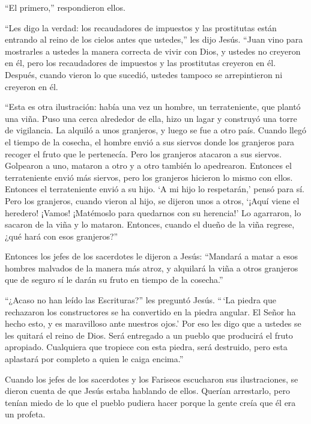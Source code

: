 ``El primero,'' respondieron ellos.

``Les digo la verdad: los recaudadores de impuestos y las prostitutas
están entrando al reino de los cielos antes que ustedes,'' les dijo
Jesús.  ``Juan vino para mostrarles a ustedes la manera
correcta de vivir con Dios, y ustedes no creyeron en él, pero los
recaudadores de impuestos y las prostitutas creyeron en él. Después,
cuando vieron lo que sucedió, ustedes tampoco se arrepintieron ni
creyeron en él.

 ``Esta es otra ilustración: había una vez un hombre, un
terrateniente, que plantó una viña. Puso una cerca alrededor de ella,
hizo un lagar y construyó una torre de vigilancia. La alquiló a unos
granjeros, y luego se fue a otro país.  Cuando llegó el
tiempo de la cosecha, el hombre envió a sus siervos donde los granjeros
para recoger el fruto que le pertenecía.  Pero los
granjeros atacaron a sus siervos. Golpearon a uno, mataron a otro y a
otro también lo apedrearon.  Entonces el terrateniente
envió más siervos, pero los granjeros hicieron lo mismo con ellos.
 Entonces el terrateniente envió a su hijo. `A mi hijo lo
respetarán,' pensó para sí.  Pero los granjeros, cuando
vieron al hijo, se dijeron unos a otros, `¡Aquí viene el heredero!
¡Vamos! ¡Matémoslo para quedarnos con su herencia!'  Lo
agarraron, lo sacaron de la viña y lo mataron.  Entonces,
cuando el dueño de la viña regrese, ¿qué hará con esos granjeros?''

 Entonces los jefes de los sacerdotes le dijeron a Jesús:
``Mandará a matar a esos hombres malvados de la manera más atroz, y
alquilará la viña a otros granjeros que de seguro sí le darán su fruto
en tiempo de la cosecha.''

 ``¿Acaso no han leído las Escrituras?'' les preguntó
Jesús. ``\,`La piedra que rechazaron los constructores se ha convertido
en la piedra angular. El Señor ha hecho esto, y es maravilloso ante
nuestros ojos.'  Por eso les digo que a ustedes se les
quitará el reino de Dios. Será entregado a un pueblo que producirá el
fruto apropiado.  Cualquiera que tropiece con esta piedra,
será destruido, pero esta aplastará por completo a quien le caiga
encima.''

 Cuando los jefes de los sacerdotes y los Fariseos
escucharon sus ilustraciones, se dieron cuenta de que Jesús estaba
hablando de ellos.  Querían arrestarlo, pero tenían miedo
de lo que el pueblo pudiera hacer porque la gente creía que él era un
profeta.

